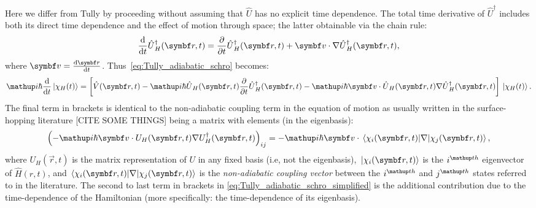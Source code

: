 Here we differ from Tully by proceeding without assuming that $\hat U$ has no explicit time dependence. The total time derivative of $\hat U^\dagger$ includes both its direct time dependence and the effect of motion through space; the latter obtainable via the chain rule:
\begin{align}
\dv{t}\hat U^\dagger_H(\vec r, t)
 = \pdv{t} \hat U^\dagger_H(\vec r, t) + \vec v\cdot \nabla \hat U^\dagger_H(\vec r, t),
\end{align}
where $\vec v = \dv{\vec r}{t}$. Thus~\eqref{eq:Tully_adiabatic_schro} becomes:
\begin{align}\label{eq:Tully_adiabatic_schro_simplified}
\ii\hbar\dv{t}\ket{\chi_H(t)} = \left[
  \hat V(\vec r, t)
  - \ii\hbar\hat U_H(\vec r, t)\pdv{t} \hat U^\dagger_H(\vec r, t)
   - \ii\hbar\vec v\cdot \hat U_H(\vec r, t)\nabla \hat U^\dagger_H(\vec r, t)
 \right]\ket{\chi_H(t)}.
\end{align}
The final term in brackets is identical to the non-adiabatic coupling term in the equation of motion as usually written in the surface-hopping literature [CITE SOME THINGS] being a matrix with elements (in the eigenbasis):
\begin{align}
\left(- \ii\hbar\vec v\cdot U_H(\vec r, t)\nabla U^\dagger_H(\vec r, t)\right)_{ij}
= - \ii\hbar\vec v\cdot\matrixel{\chi_i(\vec r, t)}{\nabla}{\chi_j (\vec r, t)},
\end{align}
where $U_H(\vec r, t)$ is the matrix representation of $U$ in any fixed basis (i.e, not the eigenbasis), $\ket{\chi_i(\vec r, t)}$ is the $i^\up{th}$ eigenvector of $\hat H(r, t)$, and $\matrixel{\chi_i(\vec r, t)}{\nabla}{\chi_j (\vec r, t)}$ is the \emph{non-adiabatic coupling vector} between the $i^\up{th}$ and $j^\up{th}$ states referred to in the literature. The second to last term in brackets in \eqref{eq:Tully_adiabatic_schro_simplified}
is the additional contribution due to the time-dependence of the Hamiltonian (more specifically: the time-dependence of its eigenbasis).

